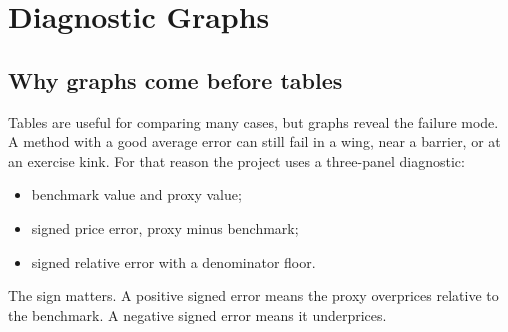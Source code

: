 \documentclass[11pt,oneside]{book}
\theoremstyle{definition}
\begin{document}
\chapter{Diagnostic Graphs}

\section{Why graphs come before tables}
Tables are useful for comparing many cases, but graphs reveal the failure mode. A method with a good average error can still fail in a wing, near a barrier, or at an exercise kink. For that reason the project uses a three-panel diagnostic:
\begin{itemize}
  \item benchmark value and proxy value;
  \item signed price error, proxy minus benchmark;
  \item signed relative error with a denominator floor.
\end{itemize}
The sign matters. A positive signed error means the proxy overprices relative to the benchmark. A negative signed error means it underprices.
\end{document}
